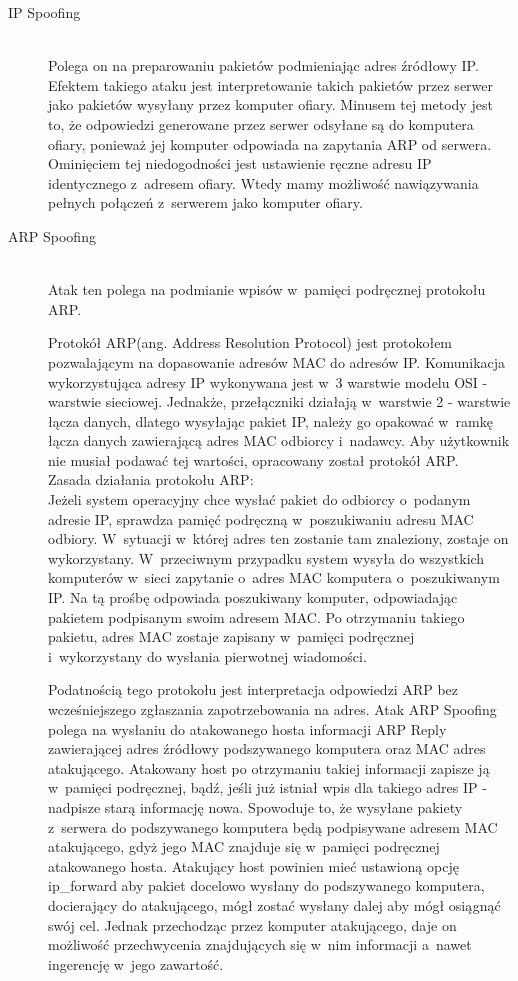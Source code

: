 \documentclass[a4paper,12pt]{book}
\begin{document}
			\begin{description}
				\item[IP Spoofing]\hfill \\
					Polega on na preparowaniu pakietów podmieniając adres źródłowy IP.
					Efektem takiego ataku jest interpretowanie takich pakietów przez serwer jako pakietów wysyłany przez komputer ofiary.
					Minusem tej metody jest to, że odpowiedzi generowane przez serwer odsyłane są do komputera ofiary, ponieważ jej  komputer odpowiada na zapytania ARP od serwera.\\
					Ominięciem tej niedogodności jest ustawienie ręczne adresu IP identycznego z~adresem ofiary.
					Wtedy mamy możliwość nawiązywania pełnych połączeń z~serwerem jako komputer ofiary.
				\item[ARP Spoofing]\hfill \\
					Atak ten polega na podmianie wpisów w~pamięci podręcznej protokołu ARP.
					
					Protokół ARP(ang. Address Resolution Protocol) jest protokołem pozwalającym na dopasowanie adresów MAC do adresów IP.
					Komunikacja wykorzystująca adresy IP wykonywana jest w~3 warstwie modelu OSI - warstwie sieciowej.
					Jednakże, przełączniki działają w~warstwie 2 - warstwie łącza danych, dlatego wysyłając pakiet IP, należy go opakować w~ramkę łącza danych zawierającą adres MAC odbiorcy i~nadawcy.
					Aby użytkownik nie musiał podawać tej wartości, opracowany został protokół ARP.\\
					Zasada działania protokołu ARP:\\
					Jeżeli system operacyjny chce wysłać pakiet do odbiorcy o~podanym adresie IP, sprawdza pamięć podręczną w~poszukiwaniu adresu MAC odbiory.
					W~sytuacji w~której adres ten zostanie tam znaleziony, zostaje on wykorzystany.
					W~przeciwnym przypadku system wysyła do wszystkich komputerów w~sieci zapytanie o~adres MAC komputera o~poszukiwanym IP.
					Na tą prośbę odpowiada poszukiwany komputer, odpowiadając pakietem podpisanym swoim adresem MAC.
					Po otrzymaniu takiego pakietu, adres MAC zostaje zapisany w~pamięci podręcznej i~wykorzystany do wysłania pierwotnej wiadomości.
					
					Podatnością tego protokołu jest interpretacja odpowiedzi ARP bez wcześniejszego zgłaszania zapotrzebowania na adres.
					Atak ARP Spoofing polega na wysłaniu do atakowanego hosta informacji ARP Reply zawierającej adres źródłowy podszywanego komputera oraz MAC adres atakującego.
					Atakowany host po otrzymaniu takiej informacji zapisze ją w~pamięci podręcznej, bądź, jeśli już istniał wpis dla takiego adres IP - nadpisze starą informację nowa.
					Spowoduje to, że wysyłane pakiety z~serwera do podszywanego komputera będą podpisywane adresem MAC atakującego, gdyż jego MAC znajduje się w~pamięci podręcznej atakowanego hosta.
					Atakujący host powinien mieć ustawioną opcję ip\_forward aby pakiet docelowo wysłany do podszywanego komputera, docierający do atakującego, mógł zostać wysłany dalej aby mógł osiągnąć swój cel.
					Jednak przechodząc przez komputer atakującego, daje on możliwość przechwycenia znajdujących się w~nim informacji a~nawet ingerencję w~jego zawartość.
			\end{description}
\end{document}
